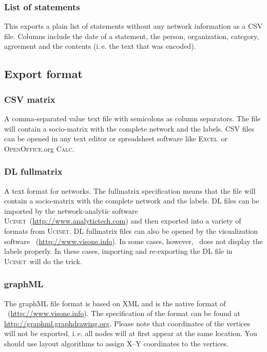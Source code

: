 \documentclass[12pt,a4paper]{scrreprt}
\newcommand{\visonecolor}
{\textsf%
 {\protect\raisebox{.5ex}{\color[rgb]{1,0,0}v}%
  \protect\raisebox{.1ex}{\color[rgb]{0,1,0}i}%
  \protect\raisebox{-.1ex}{\color[rgb]{0,0,1}s}%
  \protect\raisebox{.1ex}{\color[rgb]{1,0.8,0}o}%
  \protect\raisebox{-.1ex}{\color[rgb]{1,0,0.8}n}%
  \protect\raisebox{-.4ex}{\color[rgb]{0,0.8,0.8}e}%
 }%
}
\newcommand{\ucinet}{\textsc{Ucinet}}
\newcommand{\excel}{\textsc{Excel}}
\newcommand{\calc}{\textsc{OpenOffice}.org \textsc{Calc}}
\begin{document}
\subsubsection{List of statements}
This exports a plain list of statements without any network information as a CSV file. Columns include the date of a statement, the person, organization, category, agreement and the contents (i.\,e. the text that was encoded).


\subsection{Export format}

\subsubsection{CSV matrix}
A comma-separated value text file with semicolons as column separators. The file will contain a socio-matrix with the complete network and the labels. CSV files can be opened in any text editor or spreadsheet software like \excel\ or \calc.

\subsubsection{DL fullmatrix}
A text format for networks. The fullmatrix specification means that the file will contain a socio-matrix with the complete network and the labels. DL files can be imported by the network-analytic software \ucinet\ (\url{http://www.analytictech.com}) and then exported into a variety of formats from \ucinet. DL fullmatrix files can also be opened by the visualization software \visonecolor\ (\url{http://www.visone.info}). In some cases, however, \visonecolor\ does not display the labels properly. In these cases, importing and re-exporting the DL file in \ucinet\ will do the trick.

\subsubsection{graphML}
The graphML file format is based on XML and is the native format of \visonecolor\ (\url{http://www.visone.info}). The specification of the format can be found at \url{http://graphml.graphdrawing.org}. Please note that coordinates of the vertices will not be exported, i.\,e. all nodes will at first appear at the same location. You should use layout algorithms to assign X--Y coordinates to the vertices.
\end{document}
